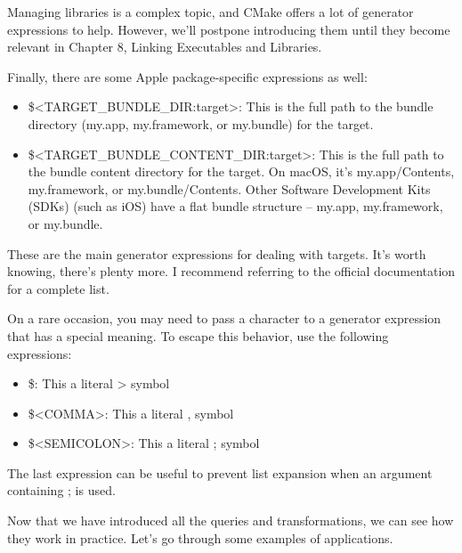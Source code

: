 Managing libraries is a complex topic, and CMake offers a lot of generator expressions to help. However, we’ll postpone introducing them until they become relevant in Chapter 8, Linking Executables and Libraries.

Finally, there are some Apple package-specific expressions as well:

\begin{itemize}
\item
\$<TARGET\_BUNDLE\_DIR:target>: This is the full path to the bundle directory (my.app, my.framework, or my.bundle) for the target.

\item
\$<TARGET\_BUNDLE\_CONTENT\_DIR:target>: This is the full path to the bundle content directory for the target. On macOS, it’s my.app/Contents, my.framework, or my.bundle/Contents. Other Software Development Kits (SDKs) (such as iOS) have a flat bundle structure – my.app, my.framework, or my.bundle.
\end{itemize}

These are the main generator expressions for dealing with targets. It’s worth knowing, there’s plenty more. I recommend referring to the official documentation for a complete list.


On a rare occasion, you may need to pass a character to a generator expression that has a special meaning. To escape this behavior, use the following expressions:

\begin{itemize}
\item
\$<ANGLE-R>: This a literal > symbol

\item
\$<COMMA>: This a literal , symbol

\item
\$<SEMICOLON>: This a literal ; symbol
\end{itemize}

The last expression can be useful to prevent list expansion when an argument containing ; is used.

Now that we have introduced all the queries and transformations, we can see how they work in practice. Let’s go through some examples of applications.









